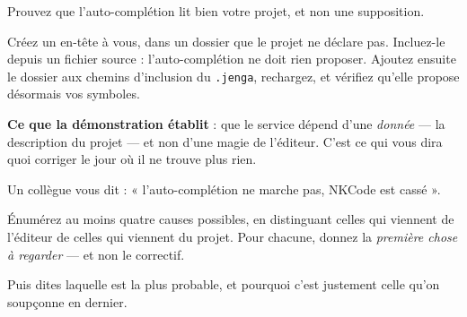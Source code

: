 \begin{nkdemo}
Prouvez que l'auto-complétion lit bien votre projet, et non une supposition.

Créez un en-tête à vous, dans un dossier que le projet ne déclare pas.
Incluez-le depuis un fichier source : l'auto-complétion ne doit rien proposer.
Ajoutez ensuite le dossier aux chemins d'inclusion du \texttt{.jenga},
rechargez, et vérifiez qu'elle propose désormais vos symboles.

\textbf{Ce que la démonstration établit} : que le service dépend d'une
\emph{donnée} --- la description du projet --- et non d'une magie de l'éditeur.
C'est ce qui vous dira quoi corriger le jour où il ne trouve plus rien.
\end{nkdemo}

\begin{nklogique}
Un collègue vous dit : « l'auto-complétion ne marche pas, NKCode est cassé ».

Énumérez au moins quatre causes possibles, en distinguant celles qui viennent de
l'éditeur de celles qui viennent du projet. Pour chacune, donnez la
\emph{première chose à regarder} --- et non le correctif.

Puis dites laquelle est la plus probable, et pourquoi c'est justement celle
qu'on soupçonne en dernier.
\end{nklogique}
